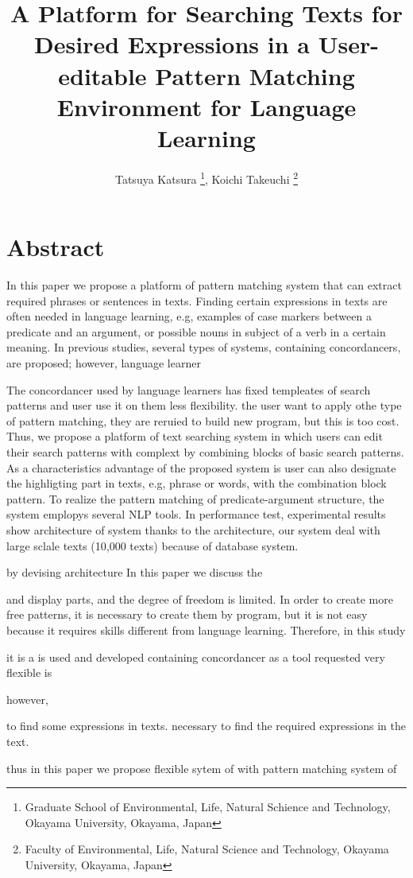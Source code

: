 \documentclass[11pt, onecolumn, twoside, a4paper]{article}
\title{A Platform for Searching Texts for Desired Expressions in a User-editable Pattern Matching Environment for Language Learning}
\author{Tatsuya Katsura \thanks{Graduate School of Environmental, Life, Natural Schience and Technology, Okayama University, Okayama, Japan}, Koichi Takeuchi \thanks{Faculty of Environmental, Life, Natural Science and Technology, Okayama University, Okayama, Japan} }
\date{}
\begin{document}
\maketitle
\thispagestyle{empty}

\section*{Abstract}
In this paper we propose a platform of pattern matching system that can extract required phrases or sentences in texts.
Finding certain expressions in texts are often needed in language learning, e.g, examples of case markers
between a predicate and an argument, or possible nouns in subject of a verb in a certain meaning. In previous studies,
several types of systems, containing concordancers, are proposed; however, language learner

The concordancer used by language learners has fixed templeates of search patterns and user use it on them
less flexibility. 
the user want to apply othe type of pattern matching, they are reruied to build new program, but this is too cost.
Thus, we propose a platform of text searching system in which users can edit their search patterns
with complext  by combining blocks of basic search patterns. As a characteristics advantage of the proposed
system is user can also designate the highligting part in texts, e.g, phrase or words,
with the combination block pattern. To realize the pattern matching of predicate-argument structure,
the system emplopys several NLP tools. In performance test, experimental results show architecture of system 
thanks to the architecture, our system deal with large sclale texts (10,000 texts) because of database system. 


by devising architecture 
In this paper we discuss the 

and display parts, and the degree of freedom is limited. In order to create more free patterns, it is necessary to create them by program, but it is not easy because it requires skills different from language learning. Therefore, in this study

it is 
a
is used and developed
containing concordancer as a tool
requested
very flexible is 

however, 

to find some expressions in texts.
necessary to find the required expressions in the text.

thus in this paper we propose flexible sytem of
with pattern matching system of 
\end{document}
